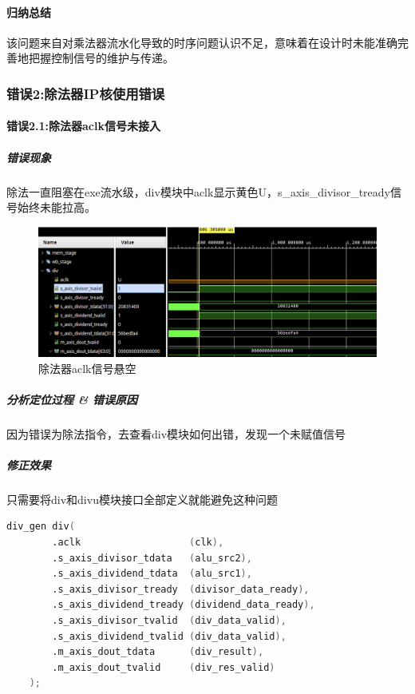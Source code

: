 \documentclass[UTF-8,twoside,c5size]{ctexart}
\begin{document}
	\paragraph{归纳总结}\hfill
			
	该问题来自对乘法器流水化导致的时序问题认识不足，意味着在设计时未能准确完善地把握控制信号的维护与传递。
	
	\subsubsection{错误\textbf{2:}除法器IP核使用错误}
	
	\paragraph{错误\textbf{2.1:}除法器aclk信号未接入}\hfill
	
	\subparagraph{错误现象}\hfill
	
	除法一直阻塞在exe流水级，div模块中aclk显示黄色U，s\_axis\_divisor\_tready信号始终未能拉高。
	
	\begin{figure}[h]
		\centering
		\includegraphics[width=0.85\linewidth]{no_aclk.png}
		\caption[no\_aclk]{除法器aclk信号悬空}
		\label{fig:noaclk}
	\end{figure}
	
	\subparagraph{分析定位过程 \& 错误原因}\hfill
	
	因为错误为除法指令，去查看div模块如何出错，发现一个未赋值信号
	
	\subparagraph{修正效果}\hfill
	
	只需要将div和divu模块接口全部定义就能避免这种问题
	
	\begin{lstlisting}[language=verilog]
	div_gen div(
		.aclk                   (clk),
		.s_axis_divisor_tdata   (alu_src2),
		.s_axis_dividend_tdata  (alu_src1),
		.s_axis_divisor_tready  (divisor_data_ready),
		.s_axis_dividend_tready (dividend_data_ready),
		.s_axis_divisor_tvalid  (div_data_valid),
		.s_axis_dividend_tvalid (div_data_valid),
		.m_axis_dout_tdata      (div_result),
		.m_axis_dout_tvalid     (div_res_valid)
	);
	\end{lstlisting}
\end{document}
